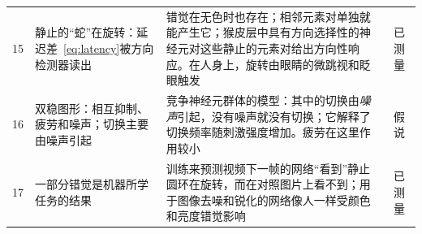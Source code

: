 {\begin{longtable}{>{\raggedright}p{0.5cm}>{\raggedright}p{4.0cm}>{\raggedright}p{5.6cm}>{\raggedright}p{2.3cm}>{\raggedright\arraybackslash}p{1.7cm}}
15 & 静止的“蛇”在旋转：延迟差~\eqref{eq:latency}被方向检测器读出 & 错觉在无色时也存在；相邻元素对单独就能产生它；猴皮层中具有方向选择性的神经元对这些静止的元素对给出方向性响应。在人身上，旋转由眼睛的微跳视和眨眼触发 & \cite{Conway2005,OteroMillan2012} & 已测量 \\
16 & 双稳图形：相互抑制、疲劳和噪声；切换主要由噪声引起 & 竞争神经元群体的模型：其中的切换由\emph{噪声}引起，没有噪声就没有切换；它解释了切换频率随刺激强度增加。疲劳在这里作用较小 & \cite{MorenoBote2007} & 假说 \\
17 & 一部分错觉是机器所学任务的结果 & 训练来预测视频下一帧的网络“看到”静止圆环在旋转，而在对照图片上看不到；用于图像去噪和锐化的网络像人一样受颜色和亮度错觉影响 & \cite{Watanabe2018,GomezVilla2020} & 已测量 \\
\bottomrule
\end{longtable}}
